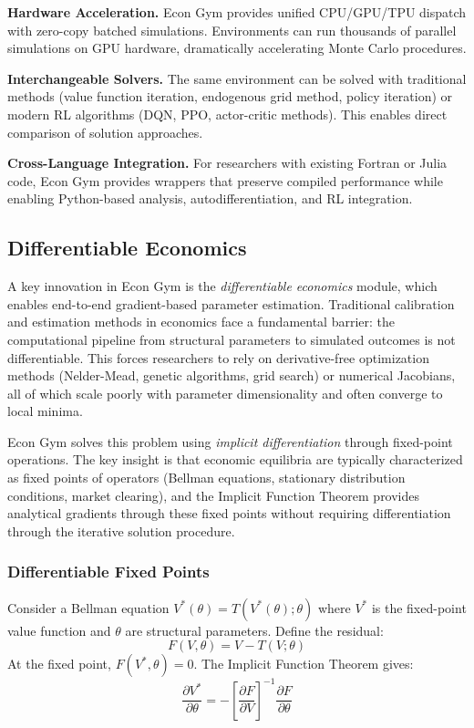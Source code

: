 \documentclass[12pt]{article}
\begin{document}
\textbf{Hardware Acceleration.} Econ Gym provides unified CPU/GPU/TPU dispatch with zero-copy batched simulations. Environments can run thousands of parallel simulations on GPU hardware, dramatically accelerating Monte Carlo procedures.

\textbf{Interchangeable Solvers.} The same environment can be solved with traditional methods (value function iteration, endogenous grid method, policy iteration) or modern RL algorithms (DQN, PPO, actor-critic methods). This enables direct comparison of solution approaches.

\textbf{Cross-Language Integration.} For researchers with existing Fortran or Julia code, Econ Gym provides wrappers that preserve compiled performance while enabling Python-based analysis, autodifferentiation, and RL integration.

\subsection{Differentiable Economics}

A key innovation in Econ Gym is the \textit{differentiable economics} module, which enables end-to-end gradient-based parameter estimation. Traditional calibration and estimation methods in economics face a fundamental barrier: the computational pipeline from structural parameters to simulated outcomes is not differentiable. This forces researchers to rely on derivative-free optimization methods (Nelder-Mead, genetic algorithms, grid search) or numerical Jacobians, all of which scale poorly with parameter dimensionality and often converge to local minima.

Econ Gym solves this problem using \textit{implicit differentiation} through fixed-point operations. The key insight is that economic equilibria are typically characterized as fixed points of operators (Bellman equations, stationary distribution conditions, market clearing), and the Implicit Function Theorem provides analytical gradients through these fixed points without requiring differentiation through the iterative solution procedure.

\subsubsection{Differentiable Fixed Points}

Consider a Bellman equation $V^*(\theta) = T(V^*(\theta); \theta)$ where $V^*$ is the fixed-point value function and $\theta$ are structural parameters. Define the residual:
\begin{equation}
    F(V, \theta) = V - T(V; \theta)
\end{equation}
At the fixed point, $F(V^*, \theta) = 0$. The Implicit Function Theorem gives:
\begin{equation}
    \frac{\partial V^*}{\partial \theta} = -\left[\frac{\partial F}{\partial V}\right]^{-1} \frac{\partial F}{\partial \theta}
\end{equation}
\end{document}
